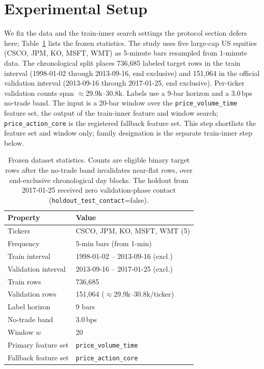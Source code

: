 \section{Experimental Setup}
\label{sec:setup}

We fix the data and the train-inner search settings the protocol section defers
here; Table~\ref{tab:dataset} lists the frozen statistics. The study uses five
large-cap US equities (CSCO, JPM, KO, MSFT, WMT) as 5-minute bars resampled from
1-minute data. The
chronological split places 736{,}685 labeled target rows in the train interval
(1998-01-02 through 2013-09-16, end exclusive) and 151{,}064 in the official
validation interval (2013-09-16 through 2017-01-25, end exclusive). Per-ticker
validation counts span $\approx$29.9k--30.8k. Labels use a 9-bar horizon and a
3.0\,bps no-trade band. The input is a 20-bar window over the
\texttt{price\_volume\_time} feature set, the output of the train-inner feature
and window search; \texttt{price\_action\_core} is the registered fallback
feature set. This step shortlists the feature set and window only; family
designation is the separate train-inner step below.

\begin{table}[t]
  \caption{Frozen dataset statistics. Counts are eligible binary target rows
    after the no-trade band invalidates near-flat rows, over end-exclusive
    chronological day blocks. The holdout from 2017-01-25 received zero
    validation-phase contact (\texttt{holdout\_test\_contact}{=}false).}
  \label{tab:dataset}
  \begin{tabular}{ll}
    \toprule
    Property & Value \\
    \midrule
    Tickers & CSCO, JPM, KO, MSFT, WMT (5) \\
    Frequency & 5-min bars (from 1-min) \\
    Train interval & 1998-01-02 -- 2013-09-16 (excl.) \\
    Validation interval & 2013-09-16 -- 2017-01-25 (excl.) \\
    Train rows & 736{,}685 \\
    Validation rows & 151{,}064 ($\approx$29.9k--30.8k/ticker) \\
    Label horizon & 9 bars \\
    No-trade band & 3.0\,bps \\
    Window $w$ & 20 \\
    Primary feature set & \texttt{price\_volume\_time} \\
    Fallback feature set & \texttt{price\_action\_core} \\
    \bottomrule
  \end{tabular}
\end{table}

